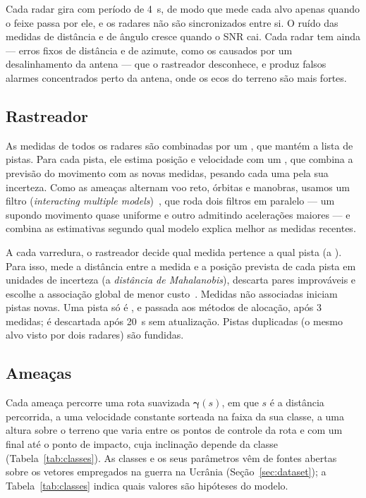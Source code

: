 Cada radar gira com período de 4~s, de modo que mede cada alvo apenas quando o feixe passa por ele, e os radares não são
sincronizados entre si. O ruído das medidas de distância e de ângulo cresce quando o SNR cai. Cada radar tem ainda
 --- erros fixos de distância e de azimute, como os causados por um desalinhamento da antena --- que o
rastreador desconhece, e produz falsos alarmes concentrados perto da antena, onde os ecos do terreno são mais fortes.

\subsection{Rastreador}
As medidas de todos os radares são combinadas por um , que mantém a lista de pistas. Para cada
pista, ele estima posição e velocidade com um , que combina a previsão do movimento com as
novas medidas, pesando cada uma pela sua incerteza. Como as ameaças alternam voo reto, órbitas e manobras, usamos um filtro
 (\emph{interacting multiple models})~\cite{blom1988}, que roda dois filtros em paralelo --- um supondo
movimento quase uniforme e outro admitindo acelerações maiores --- e combina as estimativas segundo qual modelo explica
melhor as medidas recentes.

A cada varredura, o rastreador decide qual medida pertence a qual pista (a ). Para isso, mede
a distância entre a medida e a posição prevista de cada pista em unidades de incerteza (a \emph{distância de Mahalanobis}),
descarta pares improváveis e escolhe a associação global de menor custo~\cite{barshalom2001}. Medidas não associadas
iniciam pistas novas. Uma pista só é , e passada aos métodos de alocação, após 3 medidas; é descartada
após 20~s sem atualização. Pistas duplicadas (o mesmo alvo visto por dois radares) são fundidas.

\subsection{Ameaças}
Cada ameaça percorre uma rota suavizada $\bm{\gamma}(s)$, em que $s$ é a distância percorrida, a uma velocidade constante
sorteada na faixa da sua classe, a uma altura sobre o terreno que varia entre os pontos de controle da rota e com um
 final até o ponto de impacto, cuja inclinação depende da classe (Tabela~\ref{tab:classes}). As
classes e os seus parâmetros vêm de fontes abertas sobre os vetores empregados na guerra na Ucrânia
(Seção~\ref{sec:dataset}); a Tabela~\ref{tab:classes} indica quais valores são hipóteses do modelo.

